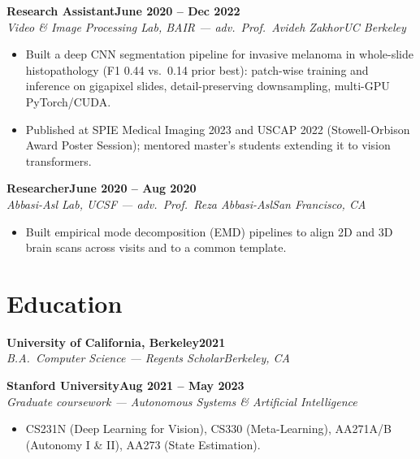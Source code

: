 \documentclass[10pt]{article}
\newcommand{\role}[4]{\textbf{#1}\hfill\textbf{#2}\\\textit{#3}\hfill\textit{#4}}
\begin{document}
\role{Research Assistant}{June 2020 -- Dec 2022}{Video \& Image Processing Lab, BAIR --- adv.\ Prof.\ Avideh Zakhor}{UC Berkeley}
\begin{itemize}
\item Built a deep CNN segmentation pipeline for invasive melanoma in whole-slide histopathology (F1 0.44 vs.\ 0.14 prior best): patch-wise training and inference on gigapixel slides, detail-preserving downsampling, multi-GPU PyTorch/CUDA.
\item Published at SPIE Medical Imaging 2023 and USCAP 2022 (Stowell-Orbison Award Poster Session); mentored master's students extending it to vision transformers.
\end{itemize}

\role{Researcher}{June 2020 -- Aug 2020}{Abbasi-Asl Lab, UCSF --- adv.\ Prof.\ Reza Abbasi-Asl}{San Francisco, CA}
\begin{itemize}
\item Built empirical mode decomposition (EMD) pipelines to align 2D and 3D brain scans across visits and to a common template.
\end{itemize}

\section*{Education}

\role{University of California, Berkeley}{2021}{B.A.\ Computer Science --- Regents Scholar}{Berkeley, CA}

\role{Stanford University}{Aug 2021 -- May 2023}{Graduate coursework --- Autonomous Systems \& Artificial Intelligence}{}
\begin{itemize}
\item CS231N (Deep Learning for Vision), CS330 (Meta-Learning), AA271A/B (Autonomy I \& II), AA273 (State Estimation).
\end{itemize}
\end{document}
